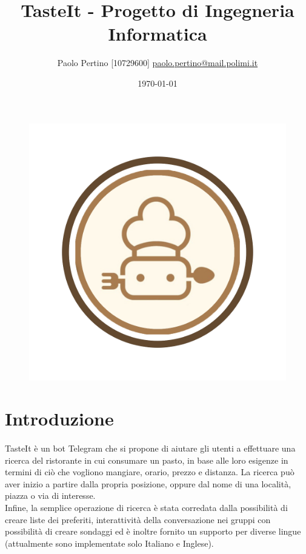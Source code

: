 \documentclass[a4paper, 12pt]{article}
\title{TasteIt - Progetto di Ingegneria Informatica}
\author{
	Paolo Pertino [10729600]
	\href{mailto:paolo.pertino@mail.polimi.it}{paolo.pertino@mail.polimi.it} \\
}
\begin{document}
	\date{\today}
	\maketitle
	
	\begin{figure}[h!]
		\centering
		\includegraphics[scale=0.35]{tasteitIntro.png}
	\end{figure}

	\newpage
	
	\tableofcontents
	
	\newpage
	
	\section{Introduzione}
	\paragraph{}
	TasteIt è un bot Telegram che si propone di aiutare gli utenti a effettuare una ricerca del ristorante in cui consumare un pasto, in base alle loro esigenze in termini di ciò che vogliono mangiare, orario, prezzo e distanza. La ricerca può aver inizio a partire dalla propria posizione, oppure dal nome di una località, piazza o via di interesse.\\
	Infine, la semplice operazione di ricerca è stata corredata dalla possibilità di creare liste dei preferiti, interattività della conversazione nei gruppi con possibilità di creare sondaggi ed è inoltre fornito un supporto per diverse lingue (attualmente sono implementate solo Italiano e Inglese).
	
\end{document}
